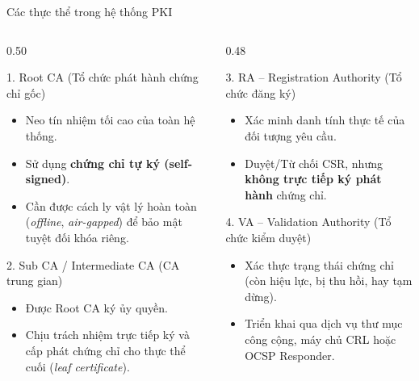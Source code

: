 \documentclass[10pt, aspectratio=169]{beamer}
\begin{document}
\begin{frame}{Các thực thể trong hệ thống PKI}
    \begin{columns}[onlytextwidth]
        \begin{column}{0.50\textwidth}
            \begin{block}{1. Root CA (Tổ chức phát hành chứng chỉ gốc)}
                \begin{itemize}
                    \item Neo tín nhiệm tối cao của toàn hệ thống.
                    \item Sử dụng \textbf{chứng chỉ tự ký (self-signed)}.
                    \item Cần được cách ly vật lý hoàn toàn (\textit{offline}, \textit{air-gapped}) để bảo mật tuyệt đối khóa riêng.
                \end{itemize}
            \end{block}
            \begin{block}{2. Sub CA / Intermediate CA (CA trung gian)}
                \begin{itemize}
                    \item Được Root CA ký ủy quyền.
                    \item Chịu trách nhiệm trực tiếp ký và cấp phát chứng chỉ cho thực thể cuối (\textit{leaf certificate}).
                \end{itemize}
            \end{block}
        \end{column}
        \begin{column}{0.48\textwidth}
            \begin{block}{3. RA -- Registration Authority (Tổ chức đăng ký)}
                \begin{itemize}
                    \item Xác minh danh tính thực tế của đối tượng yêu cầu.
                    \item Duyệt/Từ chối CSR, nhưng \textbf{không trực tiếp ký phát hành} chứng chỉ.
                \end{itemize}
            \end{block}
            \begin{block}{4. VA -- Validation Authority (Tổ chức kiểm duyệt)}
                \begin{itemize}
                    \item Xác thực trạng thái chứng chỉ (còn hiệu lực, bị thu hồi, hay tạm dừng).
                    \item Triển khai qua dịch vụ thư mục công cộng, máy chủ CRL hoặc OCSP Responder.
                \end{itemize}
            \end{block}
        \end{column}
    \end{columns}
\end{frame}
\end{document}
